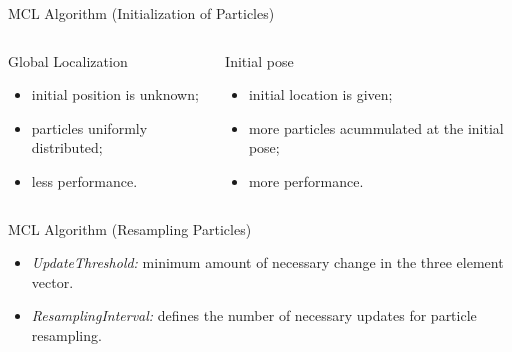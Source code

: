 \begin{frame}{MCL Algorithm (Initialization of Particles)}

    \begin{columns}
        \begin{column}{0.45\textwidth}
            \begin{block}{Global Localization}
                \begin{itemize}
                    \item initial position is unknown;
                    \item particles uniformly distributed;
                    \item less performance.
                \end{itemize}
            \end{block}
        \end{column}
        \hfill
        \begin{column}{0.45\textwidth}
            \begin{block}{Initial pose}
                \begin{itemize}
                    \item initial location is given;
                    \item more particles acummulated at the initial pose;
                    \item more performance.
                \end{itemize}
            \end{block}
        \end{column}
    \end{columns}
    
\end{frame}


\begin{frame}{MCL Algorithm (Resampling Particles)}

    \begin{itemize}
        \item {\itshape UpdateThreshold:} minimum amount of necessary change in the three element vector.
        \item {\itshape ResamplingInterval:} defines the number of necessary updates for particle resampling.
    \end{itemize}
    
\end{frame}